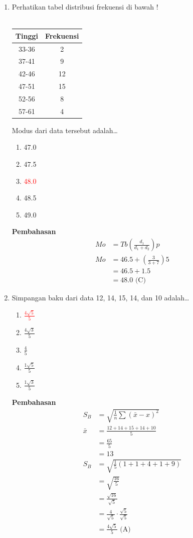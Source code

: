 \documentclass{report}
\newcommand{\options}[5]{
\begin{enumerate}[label=\alph*.]
	\item #1
	\item #2
	\item #3
	\item #4
	\item #5
\end{enumerate}
}
\newcommand{\pemb}{ \textbf{Pembahasan} \\}
\begin{document}
\begin{enumerate}
\item Perhatikan tabel distribusi frekuensi di bawah ! \\
\\
\begin{center}
\begin{tabular}{|c|c|}
	\hline
	Tinggi & Frekuensi \\
	\hline
	33-36 & 2 \\
	\hline
	37-41 & 9 \\
	\hline
	42-46 & 12 \\
	\hline
	47-51 & 15 \\
	\hline
	52-56 & 8 \\
	\hline
	57-61 & 4 \\
	\hline
\end{tabular}
\end{center}
Modus dari data tersebut adalah\ldots \\
\options
{47.0}
{47.5}
{\textcolor{red}{48.0}}
{48.5}
{49.0}
\pemb
\begin{align*}
	Mo&=Tb\left(\frac{d_{1}}{d_{1}+d_{2}}\right)p\\
	Mo&=46.5+\left(\frac{3}{3+7}\right)5\\
	&=46.5+1.5\\
	&=48.0\text{ (C)}
\end{align*}

\item Simpangan baku dari data 12, 14, 15, 14, dan 10 adalah\ldots
\options
{\textcolor{red}{$\frac{4\sqrt{5}}{5}$}}
{$\frac{4\sqrt{3}}{5}$}
{$\frac{4}{5}$}
{$\frac{1\sqrt{5}}{5}$}
{$\frac{1\sqrt{3}}{5}$}
\pemb
\begin{align*}
  S_{B} &=\sqrt{\frac{1}{n}\sum\left(\bar{x}-x\right)^2}\\
\bar{x} &=\frac{12+14+15+14+10}{5}\\
	&=\frac{65}{5}\\ &=13\\
  S_{B} &=\sqrt{\frac{1}{5}(1+1+4+1+9)}\\
	&=\sqrt{\frac{16}{5}} \\
	&=\frac{\sqrt{16}}{\sqrt{5}} \\
	&=\frac{4}{\sqrt{5}} \cdot \frac{\sqrt{5}}{\sqrt{5}} \\
	&=\frac{4\sqrt{5}}{5} \text{ (A)}
\end{align*}


\end{enumerate}
\end{document}

